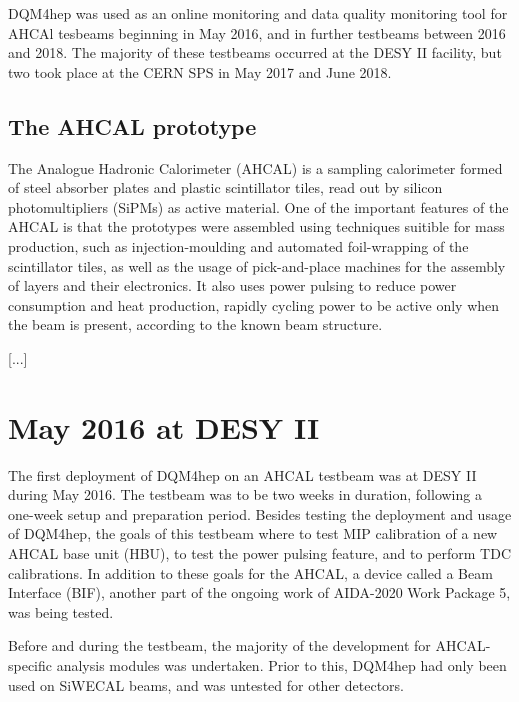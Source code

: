 DQM4hep was used as an online monitoring and data quality monitoring tool for AHCAl tesbeams beginning in May 2016, and in further testbeams between 2016 and 2018. The majority of these testbeams occurred at the DESY II facility, but two took place at the CERN SPS in May 2017 and June 2018.

\subsection*{The AHCAL prototype} %
The Analogue Hadronic Calorimeter (AHCAL) is a sampling calorimeter formed of steel absorber plates and plastic scintillator tiles, read out by silicon photomultipliers (SiPMs) as active material. One of the important features of the AHCAL is that the prototypes were assembled using techniques suitible for mass production, such as injection-moulding and automated foil-wrapping of the scintillator tiles, as well as the usage of pick-and-place machines for the assembly of layers and their electronics. It also uses power pulsing to reduce power consumption and heat production, rapidly cycling power to be active only when the beam is present, according to the known beam structure\cite{proceedings-ahcal-prototype}.

[...]

\section{May 2016 at DESY II}
The first deployment of DQM4hep on an AHCAL testbeam was at DESY II during May 2016. The testbeam was to be two weeks in duration, following a one-week setup and preparation period. Besides testing the deployment and usage of DQM4hep, the goals of this testbeam where to test MIP calibration of a new AHCAL base unit (HBU), to test the power pulsing feature, and to perform TDC calibrations. In addition to these goals for the AHCAL, a device called a Beam Interface (BIF), another part of the ongoing work of AIDA-2020 Work Package 5, was being tested. %

Before and during the testbeam, the majority of the development for AHCAL-specific analysis modules was undertaken. Prior to this, DQM4hep had only been used on SiWECAL beams, and was untested for other detectors. 

